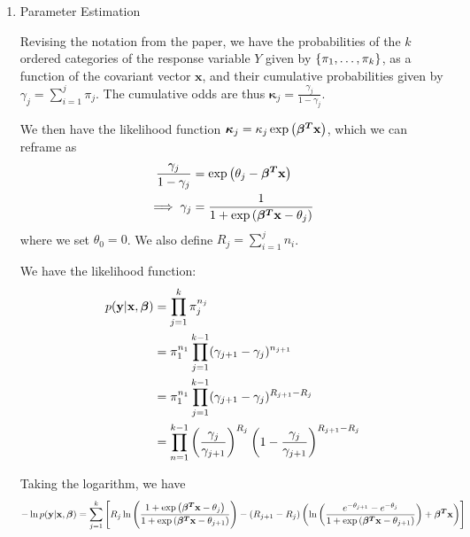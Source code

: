 \documentclass[reqno]{amsart}
\begin{document}
\begin{enumerate}[label=\textbf{(\Roman*)}]
\begin{enumerate}[label=\textbf{(\alph*)}]
           
        \end{enumerate}
        \item \question Parameter Estimation
        
        \solution
    Revising the notation from the paper, we have the probabilities of the \(k\) ordered categories of the response variable \(Y\) given by \(\left\{\pi_1, \ldots, \pi_{k}\right\}\), as a function of the covariant vector \(\mathbf{x}\), and their cumulative probabilities given by \(\displaystyle \gamma_j = \sum_{i = 1}^{j} \pi_j\). The cumulative odds are thus \(\boldsymbol{\kappa}_j = \frac{\gamma_j}{1 - \gamma_j}\).

    We then have the likelihood function \(\boldsymbol{\kappa}_j = \kappa_j \exp \left(\boldsymbol{\beta^T}\mathbf{x}\right)\), which we can reframe as \begin{align}
        \begin{split}
            \frac{\gamma_j}{1 - \gamma_j} &= \exp \left(\theta_j - \boldsymbol{\beta^T}\mathbf{x}\right) \\
            \implies \gamma_{j} &= \frac{1}{1 + \exp \left(\boldsymbol{\beta^T}\mathbf{x} - \theta_j\right)} 
        \end{split}
    \end{align}
    where we set \(\theta_0 = 0\).
    We also define \(\displaystyle R_j = \sum_{i = 1}^{j} n_i\).

    We have the likelihood function:
    \begin{align}
        \begin{split}
            p(\mathbf{y}|\mathbf{x}, \boldsymbol{\beta}) &= \prod_{j = 1}^{k} \pi_j^{n_j} \\
            &= \pi_1^{n_1} \prod_{j = 1}^{k-1} (\gamma_{j + 1} - \gamma_j)^{n_{j + 1}} \\
            &= \pi_1^{n_1} \prod_{j = 1}^{k-1} (\gamma_{j + 1} - \gamma_j)^{R_{j + 1} - R_j}  \\
            &= \prod_{n = 1}^{k-1} \left(\frac{\gamma_j}{\gamma_{j + 1}}\right)^{R_j} \left(1 - \frac{\gamma_j}{\gamma_{j + 1}}\right)^{R_{j + 1} - R_j} \\
        \end{split}
    \end{align}

    Taking the logarithm, we have
    \begin{align}
        \begin{split}
            -\ln p(\mathbf{y}|\mathbf{x}, \boldsymbol{\beta}) &= 
            \sum_{j = 1}^{k} \left[R_j \ln \left(\frac{1 + \exp \left(\boldsymbol{\beta^T}\mathbf{x} - \theta_j\right)}{1 + \exp \left(\boldsymbol{\beta^T}\mathbf{x} - \theta_{j+1}\right)}\right) 
            - (R_{j + 1} - R_j) \left(\ln \left(\frac{e^{-\theta_{j + 1}} - e^{-\theta_j}}{1 + \exp \left(\boldsymbol{\beta^T}\mathbf{x} - \theta_{j+1}\right)}\right) + \boldsymbol{\beta^T}\mathbf{x}\right)\right] \\
        \end{split}
    \end{align}


\end{enumerate}
\end{document}
